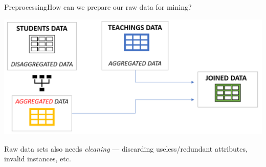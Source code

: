 \begin{frame}{Preprocessing}{How can we prepare our raw data for mining?}

    \vspace{0.5cm}
    \begin{centering}
        \hspace*{-0.5cm}\includegraphics[scale=0.27]{img5.png}
    \end{centering}

    Raw data sets also needs \emph{cleaning} --- discarding useless/redundant attributes, invalid instances, etc.

\end{frame}

